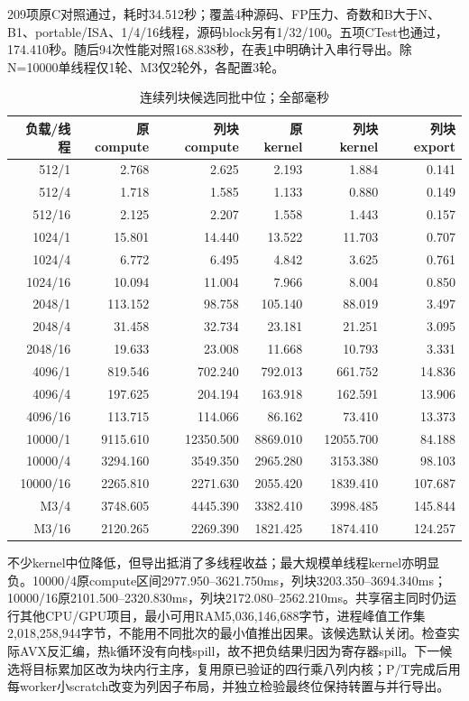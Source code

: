 \documentclass[UTF8,a4paper,11pt]{ctexart}
\begin{document}
209项原C对照通过，耗时34.512秒；覆盖4种源码、FP压力、奇数和B大于N、B1、portable/ISA、1/4/16线程，源码block另有1/32/100。五项CTest也通过，174.410秒。随后94次性能对照168.838秒，在表\ref{tab:column}中明确计入串行导出。除N=10000单线程仅1轮、M3仅2轮外，各配置3轮。
\begin{table}[htbp]\centering\small\setlength{\tabcolsep}{3pt}
\caption{连续列块候选同批中位；全部毫秒}\label{tab:column}
\begin{tabular}{rrrrrr}\toprule
负载/线程&原compute&列块compute&原kernel&列块kernel&列块export\\\midrule
512/1&2.768&2.625&2.193&1.884&0.141\\
512/4&1.718&1.585&1.133&0.880&0.149\\
512/16&2.125&2.207&1.558&1.443&0.157\\
1024/1&15.801&14.440&13.522&11.703&0.707\\
1024/4&6.772&6.495&4.842&3.625&0.761\\
1024/16&10.094&11.004&7.966&8.004&0.850\\
2048/1&113.152&98.758&105.140&88.019&3.497\\
2048/4&31.458&32.734&23.181&21.251&3.095\\
2048/16&19.633&23.008&11.668&10.793&3.331\\
4096/1&819.546&702.240&792.013&661.752&14.836\\
4096/4&197.625&204.194&163.918&162.591&13.906\\
4096/16&113.715&114.066&86.162&73.410&13.373\\
10000/1&9115.610&12350.500&8869.010&12055.700&84.188\\
10000/4&3294.160&3549.350&2965.280&3153.380&98.103\\
10000/16&2265.810&2271.630&2055.420&1839.410&107.687\\
M3/4&3748.605&4445.390&3382.410&3998.485&145.844\\
M3/16&2120.265&2269.390&1821.425&1874.410&124.257\\\bottomrule
\end{tabular}\end{table}
不少kernel中位降低，但导出抵消了多线程收益；最大规模单线程kernel亦明显负。10000/4原compute区间2977.950--3621.750ms，列块3203.350--3694.340ms；10000/16原2101.500--2320.830ms，列块2172.080--2562.210ms。共享宿主同时仍运行其他CPU/GPU项目，最小可用RAM5,036,146,688字节，进程峰值工作集2,018,258,944字节，不能用不同批次的最小值推出因果。该候选默认关闭。检查实际AVX反汇编，热k循环没有向栈spill，故不把负结果归因为寄存器spill。下一候选将目标累加区改为块内行主序，复用原已验证的四行乘八列内核；P/T完成后用每worker小scratch改变为列因子布局，并独立检验最终位保持转置与并行导出。
\end{document}
